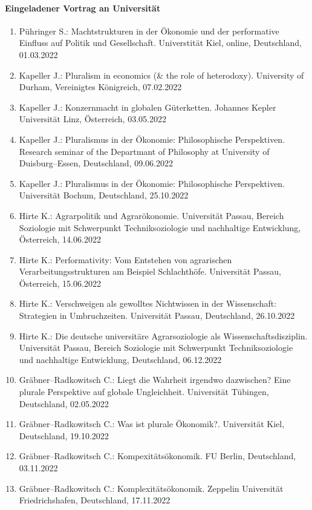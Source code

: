 \paragraph{Eingeladener Vortrag an Universität}
\begin{enumerate}
	\item Pühringer S.: Machtstrukturen in der Ökonomie und der performative Einfluss auf Politik und Gesellschaft. Universtität Kiel, online, Deutschland, 01.03.2022
	\item Kapeller J.: Pluralism in economics (\& the role of heterodoxy). University of Durham, Vereinigtes Königreich, 07.02.2022
	\item Kapeller J.: Konzernmacht in globalen Güterketten. Johannes Kepler Universität Linz, Österreich, 03.05.2022
	\item Kapeller J.: Pluralismus in der Ökonomie: Philosophische Perspektiven. Research seminar of the Departmant of Philosophy at University of Duisburg--Essen, Deutschland, 09.06.2022
	\item Kapeller J.: Pluralismus in der Ökonomie: Philosophische Perspektiven. Universität Bochum, Deutschland, 25.10.2022
	\item Hirte K.: Agrarpolitik und Agrarökonomie. Universität Passau, Bereich Soziologie mit Schwerpunkt Techniksoziologie und nachhaltige Entwicklung, Österreich, 14.06.2022
	\item Hirte K.: Performativity: Vom Entstehen von agrarischen Verarbeitungsstrukturen am Beispiel Schlachthöfe. Universität Passau, Österreich, 15.06.2022
	\item Hirte K.: Verschweigen als gewolltes Nichtwissen in der Wissenschaft: Strategien in Umbruchzeiten. Universität Passau, Deutschland, 26.10.2022
	\item Hirte K.: Die deutsche universitäre Agrarsoziologie als Wissenschaftsdisziplin. Universität Passau, Bereich Soziologie mit Schwerpunkt Techniksoziologie und nachhaltige Entwicklung, Deutschland, 06.12.2022
	\item Gräbner--Radkowitsch C.: Liegt die Wahrheit irgendwo dazwischen? Eine plurale Perspektive auf globale Ungleichheit. Universität Tübingen, Deutschland, 02.05.2022
	\item Gräbner--Radkowitsch C.: Was ist plurale Ökonomik?. Universität Kiel, Deutschland, 19.10.2022
	\item Gräbner--Radkowitsch C.: Kompexitätsökonomik. FU Berlin, Deutschland, 03.11.2022
	\item Gräbner--Radkowitsch C.: Komplexitätsökonomik. Zeppelin Universität Friedrichshafen, Deutschland, 17.11.2022
\end{enumerate}
